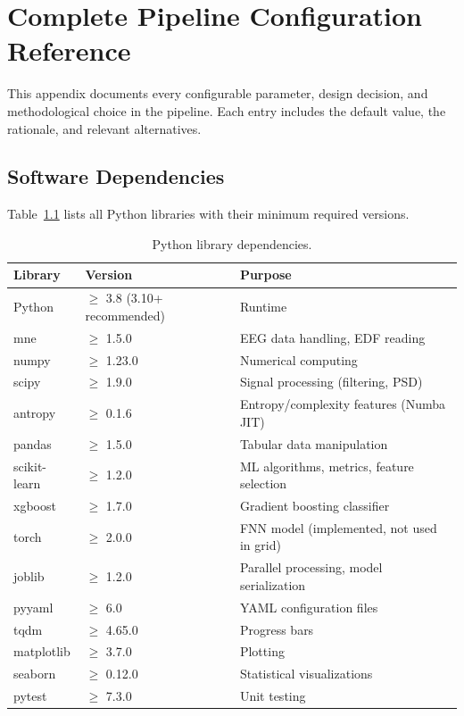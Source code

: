 \chapter{Complete Pipeline Configuration Reference}
\label{ch:pipeline_settings}


This appendix documents every configurable parameter, design decision, and methodological choice in the pipeline. Each entry includes the default value, the rationale, and relevant alternatives.

\section{Software Dependencies}
\label{sec:app_dependencies}

Table~\ref{tab:dependencies} lists all Python libraries with their minimum required versions.

\begin{table}[h]
\centering
\caption{Python library dependencies.}
\label{tab:dependencies}
\begin{tabular}{l l l}
\toprule
\textbf{Library} & \textbf{Version} & \textbf{Purpose} \\
\midrule
Python        & $\geq$ 3.8 (3.10+ recommended) & Runtime \\
mne           & $\geq$ 1.5.0   & EEG data handling, EDF reading \\
numpy         & $\geq$ 1.23.0  & Numerical computing \\
scipy         & $\geq$ 1.9.0   & Signal processing (filtering, PSD) \\
antropy       & $\geq$ 0.1.6   & Entropy/complexity features (Numba JIT) \\
pandas        & $\geq$ 1.5.0   & Tabular data manipulation \\
scikit-learn  & $\geq$ 1.2.0   & ML algorithms, metrics, feature selection \\
xgboost       & $\geq$ 1.7.0   & Gradient boosting classifier \\
torch         & $\geq$ 2.0.0   & FNN model (implemented, not used in grid) \\
joblib        & $\geq$ 1.2.0   & Parallel processing, model serialization \\
pyyaml        & $\geq$ 6.0     & YAML configuration files \\
tqdm          & $\geq$ 4.65.0  & Progress bars \\
matplotlib    & $\geq$ 3.7.0   & Plotting \\
seaborn       & $\geq$ 0.12.0  & Statistical visualizations \\
pytest        & $\geq$ 7.3.0   & Unit testing \\
\bottomrule
\end{tabular}
\end{table}

